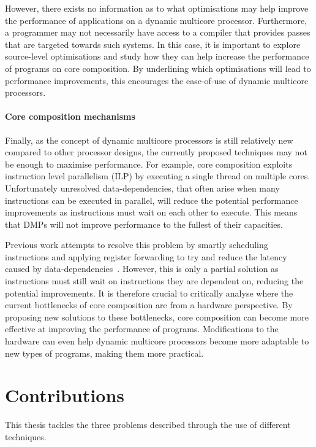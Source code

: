 However, there exists no information as to what optimisations may help improve the performance of applications on a dynamic multicore processor.
Furthermore, a programmer may not necessarily have access to a compiler that provides passes that are targeted towards such systems.
In this case, it is important to explore source-level optimisations and study how they can help increase the performance of programs on core composition.
By underlining which optimisations will lead to performance improvements, this encourages the ease-of-use of dynamic multicore processors.

\paragraph*{Core composition mechanisms} 
Finally, as the concept of dynamic multicore processors is still relatively new compared to other processor designs, the currently proposed techniques may not be enough to maximise performance.
For example, core composition exploits instruction level parallelism (ILP) by executing a single thread on multiple cores.
Unfortunately unresolved data-dependencies, that often arise when many instructions can be executed in parallel, will reduce the potential performance improvements as instructions must wait on each other to execute.
This means that DMPs will not improve performance to the fullest of their capacities.

Previous work attempts to resolve this problem by smartly scheduling instructions and applying register forwarding to try and reduce the latency caused by data-dependencies~\cite{robatmili2011uniproc}.
However, this is only a partial solution as instructions must still wait on instructions they are dependent on, reducing the potential improvements. 
It is therefore crucial to critically analyse where the current bottlenecks of core composition are from a hardware perspective.
By proposing new solutions to these bottlenecks, core composition can become more effective at improving the performance of programs.
Modifications to the hardware can even help dynamic multicore processors become more adaptable to new types of programs, making them more practical.

\vspace{-1em}
\section{Contributions}
This thesis tackles the three problems described through the use of different techniques.

